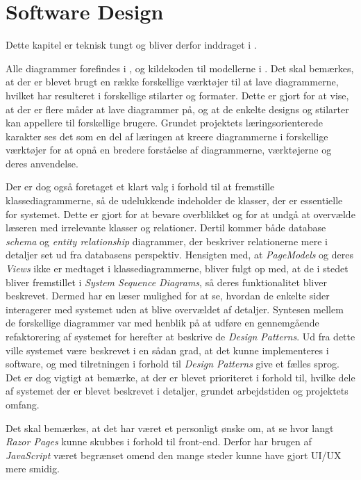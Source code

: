 \chapter{Software Design}
\label{chapter:software-design}
Dette kapitel er teknisk tungt og bliver derfor inddraget i .

Alle diagrammer forefindes i , og kildekoden til modellerne i .
Det skal bemærkes, at der er blevet brugt en række forskellige værktøjer til at lave diagrammerne, hvilket har resulteret i forskellige stilarter og formater. 
Dette er gjort for at vise, at der er flere måder at lave diagrammer på, og at de enkelte designs og stilarter kan appellere til forskellige brugere.
Grundet projektets læringsorienterede karakter ses det som en del af læringen at kreere diagrammerne i forskellige værktøjer for at opnå en bredere forståelse af diagrammerne, værktøjerne og deres anvendelse.

Der er dog også foretaget et klart valg i forhold til at fremstille klassediagrammerne, så de udelukkende indeholder de klasser, der er essentielle for systemet.
Dette er gjort for at bevare overblikket og for at undgå at overvælde læseren med irrelevante klasser og relationer.
Dertil kommer både database \emph{schema} og \emph{entity relationship} diagrammer, der beskriver relationerne mere i detaljer set ud fra databasens perspektiv.
Hensigten med, at \emph{PageModels} og deres \emph{Views} ikke er medtaget i klassediagrammerne, bliver fulgt op med, at de i stedet bliver fremstillet i \emph{System Sequence Diagrams}, så deres funktionalitet bliver beskrevet.
Dermed har en læser mulighed for at se, hvordan de enkelte sider interagerer med systemet uden at blive overvældet af detaljer.
Syntesen mellem de forskellige diagrammer var med henblik på at udføre en gennemgående refaktorering af systemet for herefter at beskrive de \emph{Design Patterns}.
Ud fra dette ville systemet være beskrevet i en sådan grad, at det kunne implementeres i software, og med tilretningen i forhold til \emph{Design Patterns} give et fælles sprog.
Det er dog vigtigt at bemærke, at der er blevet prioriteret i forhold til, hvilke dele af systemet der er blevet beskrevet i detaljer, grundet arbejdstiden og projektets omfang.

Det skal bemærkes, at det har været et personligt ønske om, at se hvor langt \emph{Razor Pages} kunne skubbes i forhold til front-end. Derfor har brugen af \emph{JavaScript} været begrænset omend den mange steder kunne have gjort UI/UX mere smidig.

